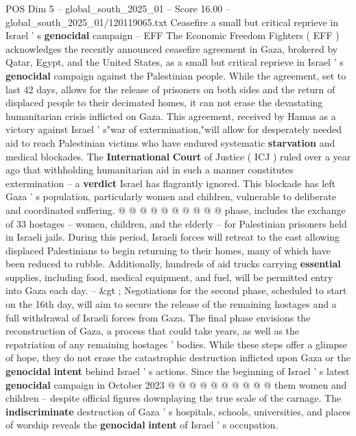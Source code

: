 \begin{textsample}{POS Dim 5 – global\_south\_2025\_01 – Score 16.00 – global\_south\_2025\_01/120119065.txt}  \label{ex:f5_pos_294}
Ceasefire a small but critical reprieve in Israel ' s \textbf{genocidal} campaign -- EFF The Economic Freedom Fighters ( EFF ) acknowledges the recently announced ceasefire agreement in Gaza, brokered by Qatar, Egypt, and the United States, as a small but critical reprieve in Israel ' s \textbf{genocidal} campaign against the Palestinian people.
While the agreement, set to last 42 days, allows for the release of prisoners on both sides and the return of displaced people to their decimated homes, it can not erase the devastating humanitarian crisis inflicted on Gaza.
This agreement, received by Hamas as a victory against Israel ' s"war of extermination,"will allow for desperately needed aid to reach Palestinian victims who have endured systematic \textbf{starvation} and medical blockades.
The \textbf{International} \textbf{Court} of Justice ( ICJ ) ruled over a year ago that withholding humanitarian aid in such a manner constitutes extermination -- a \textbf{verdict} Israel has flagrantly ignored.
This blockade has left Gaza ' s population, particularly women and children, vulnerable to deliberate and coordinated suffering. @ @ @ @ @ @ @ @ @ @ phase, includes the exchange of 33 hostages -- women, children, and the elderly -- for Palestinian prisoners held in Israeli jails.
During this period, Israeli forces will retreat to the east allowing displaced Palestinians to begin returning to their homes, many of which have been reduced to rubble.
Additionally, hundreds of aid trucks carrying \textbf{essential} supplies, including food, medical equipment, and fuel, will be permitted entry into Gaza each day. -- \&gt ; Negotiations for the second phase, scheduled to start on the 16th day, will aim to secure the release of the remaining hostages and a full withdrawal of Israeli forces from Gaza.
The final phase envisions the reconstruction of Gaza, a process that could take years, as well as the repatriation of any remaining hostages ' bodies.
While these steps offer a glimpse of hope, they do not erase the catastrophic destruction inflicted upon Gaza or the \textbf{genocidal} \textbf{intent} behind Israel ' s actions.
Since the beginning of Israel ' s latest \textbf{genocidal} campaign in October 2023 @ @ @ @ @ @ @ @ @ @ them women and children -- despite official figures downplaying the true scale of the carnage.
The \textbf{indiscriminate} destruction of Gaza ' s hospitals, schools, universities, and places of worship reveals the \textbf{genocidal} \textbf{intent} of Israel ' s occupation.

\end{textsample}
